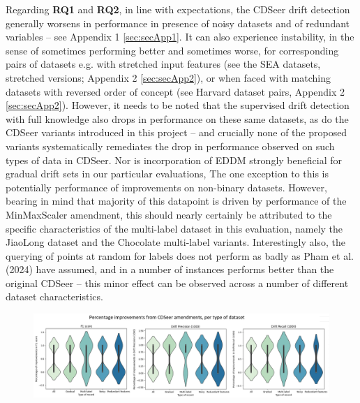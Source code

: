 \documentclass{svproc}
\begin{document}
Regarding \textbf{RQ1} and \textbf{RQ2}, in line with expectations, the CDSeer drift detection generally worsens in performance in presence of noisy datasets and of redundant variables – see Appendix 1 \ref{sec:secApp1}. It can also experience instability, in the sense of sometimes performing better and sometimes worse, for corresponding pairs of datasets e.g. with stretched input features (see the SEA datasets, stretched versions; Appendix 2 \ref{sec:secApp2}), or when faced with matching datasets with reversed order of concept (see Harvard dataset pairs, Appendix 2 \ref{sec:secApp2}). However, it needs to be noted that the supervised drift detection with full knowledge also drops in performance on these same datasets, as do the CDSeer variants introduced in this project – and crucially none of the proposed variants systematically remediates the drop in performance observed on such types of data in CDSeer. Nor is incorporation of EDDM strongly beneficial for gradual drift sets in our particular evaluations, The one exception to this is potentially performance of improvements on non-binary datasets. However, bearing in mind that majority of this datapoint is driven by performance of the MinMaxScaler amendment, this should nearly certainly be attributed to the specific characteristics of the multi-label dataset in this evaluation, namely the JiaoLong dataset and the Chocolate multi-label variants. Interestingly also, the querying of points at random for labels does not perform as badly as Pham et al. (2024) have assumed, and in a number of instances performs better than the original CDSeer – this minor effect can be observed across a number of different dataset characteristics. 

\begin{figure}
	\centering
	\includegraphics[scale=.7]{figures/Fig12_res.png}
	\label{fig:fig12}
\end{figure}
\end{document}
